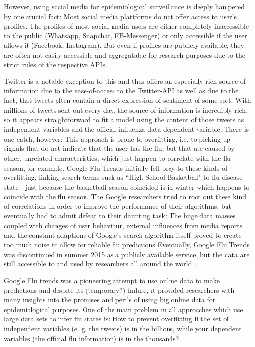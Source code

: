 \documentclass[11pt, a4paper,twoside]{report}\usepackage[]{graphicx}\usepackage[]{color}
\begin{document}
However, using social media for epidemiological surveillance is deeply hampered by one crucial fact: Most social media plattforms do not offer access to user's profiles. The profiles of most social media users are either completely inaccessible to the public (Whatsapp, Snapchat, FB-Messenger) or only accessible if the user allows it (Facebook, Instagram). But even if profiles are publicly available, they are often not easily accessible and aggregatable for research purposes due to the strict rules of the respective APIs.\newline

Twitter is a notable exception to this and thus offers an especially rich source of information due to the ease-of-access to the Twitter-API as well as due to the fact, that tweets often contain a direct expression of sentiment of some sort. With millions of tweets  sent out every day, the source of information is incredibly rich, so it appears straightforward to fit a model using the content of those tweets as independent variables and the official influenza data dependent variable. 
There is one catch, however: This approach is prone to overfitting, i.e. to picking up signals that do not indicate that the user has the flu, but that are caused by other, unrelated characteristics, which just happen to correlate with the flu season, for example. Google Flu Trends \citep{ginsberg_detecting_2009} initially fell prey to these kinds of overfitting, linking search terms such as ``High School Basketball" to flu disease state - just because the basketball season coincided is in winter which happens to coincide with the flu season. The Google researchers tried to root out these kind of correlations in order to improve the performance of their algorithms, but eventually had to admit defeat to their daunting task: The huge data masses coupled with changes of user behaviour, external influences from media reports and the constant adaptions of Google's search algorithm itself proved to create too much noise to allow for reliable flu predictions \citep{olson_reassessing_2013,butler_when_2013,lazer_parable_2014} Eventually, Google Flu Trends was discontinued in summer 2015 as a publicly available service, but the data are still accessible to and used by researchers all around the world \citep{GFT_nextchapter_2015}.\newline

Google Flu trends was a pioneering attempt to use online data to make predictions and despite its (temporary?) failure, it provided researchers with many insights into the promises and perils of using big online data for epidemiological purposes. One of the main problem in all approaches which use large data sets to infer flu states is: How to prevent overfitting if the set of independent variables (e. g. the tweets) is in the billions, while your dependent variables (the official flu information) is in the thousands?\newline
\end{document}
